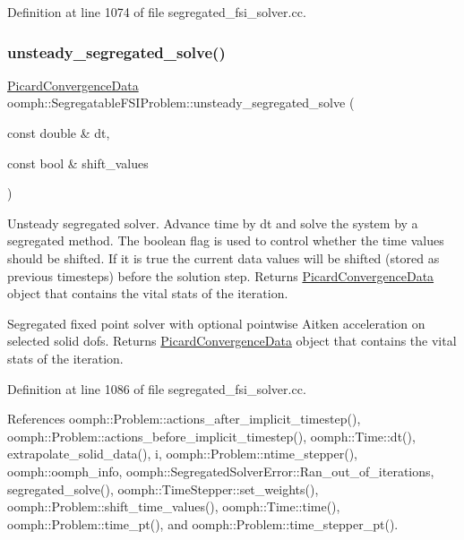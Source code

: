 Definition at line 1074 of file segregated\+\_\+fsi\+\_\+solver.\+cc.

\mbox{\label{classoomph_1_1SegregatableFSIProblem_a17f019ebaf83e170219bf605a8554111}} 
\subsubsection{\texorpdfstring{unsteady\+\_\+segregated\+\_\+solve()}{unsteady\_segregated\_solve()}\hspace{0.1cm}{\footnotesize\ttfamily [2/2]}}
{\footnotesize\ttfamily \hyperlink{classoomph_1_1PicardConvergenceData}{Picard\+Convergence\+Data} oomph\+::\+Segregatable\+F\+S\+I\+Problem\+::unsteady\+\_\+segregated\+\_\+solve (\begin{DoxyParamCaption}\item[{const double \&}]{dt,  }\item[{const bool \&}]{shift\+\_\+values }\end{DoxyParamCaption})}



Unsteady segregated solver. Advance time by dt and solve the system by a segregated method. The boolean flag is used to control whether the time values should be shifted. If it is true the current data values will be shifted (stored as previous timesteps) before the solution step. Returns \hyperlink{classoomph_1_1PicardConvergenceData}{Picard\+Convergence\+Data} object that contains the vital stats of the iteration. 

Segregated fixed point solver with optional pointwise Aitken acceleration on selected solid dofs. Returns \hyperlink{classoomph_1_1PicardConvergenceData}{Picard\+Convergence\+Data} object that contains the vital stats of the iteration. 

Definition at line 1086 of file segregated\+\_\+fsi\+\_\+solver.\+cc.



References oomph\+::\+Problem\+::actions\+\_\+after\+\_\+implicit\+\_\+timestep(), oomph\+::\+Problem\+::actions\+\_\+before\+\_\+implicit\+\_\+timestep(), oomph\+::\+Time\+::dt(), extrapolate\+\_\+solid\+\_\+data(), i, oomph\+::\+Problem\+::ntime\+\_\+stepper(), oomph\+::oomph\+\_\+info, oomph\+::\+Segregated\+Solver\+Error\+::\+Ran\+\_\+out\+\_\+of\+\_\+iterations, segregated\+\_\+solve(), oomph\+::\+Time\+Stepper\+::set\+\_\+weights(), oomph\+::\+Problem\+::shift\+\_\+time\+\_\+values(), oomph\+::\+Time\+::time(), oomph\+::\+Problem\+::time\+\_\+pt(), and oomph\+::\+Problem\+::time\+\_\+stepper\+\_\+pt().

